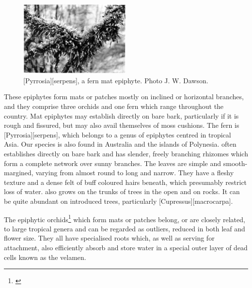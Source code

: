 \begin{figure}
	\includegraphics[width=0.5\textwidth]{graphics/figure38pyrrosia.jpg}
	\centering
	\caption[\emph{Pyrrosia serpens}, a fern mat epiphyte]{[Pyrrosia][serpens], a fern mat epiphyte.
	Photo  J. W. Dawson.}%
	\label{fig:38pyrrosia}
\end{figure}

These epiphytes form mats or patches mostly on inclined or horizontal branches, and they comprise three orchids and one fern which range throughout the country.
Mat epiphytes may establish directly on bare bark, particularly if it is rough and fissured, but may also avail themselves of moss cushions.
The fern is [Pyrrosia][serpens], which belongs to a genus of epiphytes centred in tropical Asia.
Our species is also found in Australia and the islands of Polynesia.  often establishes directly on bare bark and has slender, freely branching rhizomes which form a complete network over sunny branches.
The leaves are simple and smooth-margined, varying from almost round to long and narrow.
They have a fleshy texture and a dense felt of buff coloured hairs beneath, which presumably restrict loss of water.  also grows on the trunks of trees in the open and on rocks.
It can be quite abundant on introduced trees, particularly [Cupressus][macrocarpa].

The epiphytic orchids\footnote{\cite{hatch1948epiphytic}} which form mats or patches belong, or are closely related, to large tropical genera and can be regarded as outliers, reduced in both leaf and flower size.
They all have specialised roots which, as well as serving for attachment, also efficiently absorb and store water in a special outer layer of dead cells known as the velamen.

